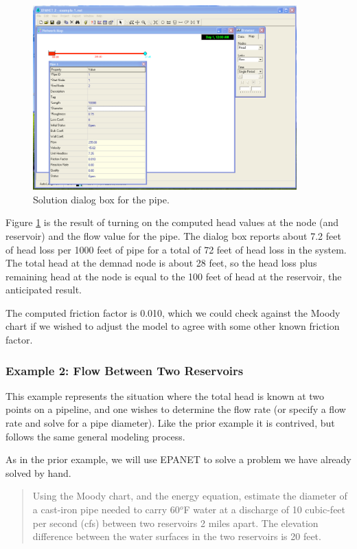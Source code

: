 \begin{figure}[htbp] %
   \centering
   \includegraphics[width=4in]{interpret-solution.pdf} 
   \caption{Solution dialog box for the pipe.}
   \label{fig:interpret-solution}
\end{figure}

Figure \ref{fig:interpret-solution} is the result of turning on the computed head values at the node (and reservoir) and the flow value for the pipe.  The dialog box reports about 7.2 feet of head loss per 1000 feet of pipe for a total of 72 feet of head loss in the system.   The total head at the demnad node is about 28 feet, so the head loss plus remaining head at the node is equal to the 100 feet of head at the reservoir, the anticipated result.  

The computed friction factor is 0.010, which we could check against the Moody chart if we wished to adjust the model to agree with some other known friction factor.   
\clearpage
\subsubsection{Example 2: Flow Between Two Reservoirs}
This example represents the situation where the total head is known at two points on a pipeline, and one wishes to determine the flow rate (or specify a flow rate and solve for a pipe diameter).   Like the prior example it is contrived, but follows the same general modeling process.

As in the prior example, we will use EPANET to solve a problem we have already solved by hand.

\begin{quote}
Using the Moody chart, and the energy equation, estimate the diameter of a cast-iron pipe needed to carry 60$^o$F water at a discharge of 10 cubic-feet per second (cfs) between two reservoirs 2 miles apart.  The elevation difference between the water surfaces in the two reservoirs is 20 feet.
\end{quote}

